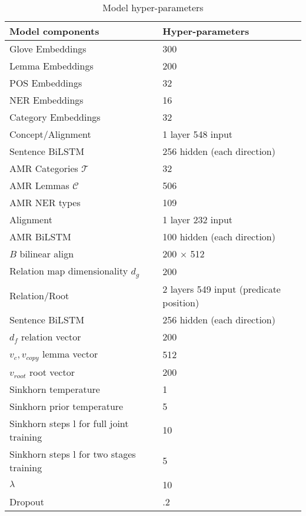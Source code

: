 \documentclass[11pt,a4paper]{article}
\begin{document}
\begin{table}[t!]\small
    \begin{center} 
        \begin{tabular}{ll} 
            \hline  Model components &  Hyper-parameters \\  \hline
          Glove Embeddings & 300\\
            Lemma Embeddings & 200\\
            POS Embeddings & 32\\
            NER Embeddings & 16\\
            Category Embeddings & 32\\ \hline 
           Concept/Alignment & 1 layer 548 input \\
          Sentence BiLSTM & 256 hidden (each direction)\\ \hline 
            AMR Categories $\mathcal{T}$& 32\\
            AMR Lemmas $\mathcal{C}$  & 506\\
           AMR NER types & 109\\ \hline 
           Alignment   & 1 layer 232 input \\
           AMR BiLSTM  & 100 hidden (each direction)\\ \hline 
            $B$ bilinear align  & 200 $\times$ 512\\ \hline 
            Relation map dimensionality $d_g$  & 200 \\ \hline 
           Relation/Root &2  layers 549 input \tiny(predicate position)  \\
            Sentence BiLSTM&  256 hidden (each direction)\\ \hline 
            $d_f$ relation vector& 200\\
           $v_{c},v_{copy}$ lemma vector & 512\\
           $v_{root}$ root vector & 200\\
           \hline
           Sinkhorn temperature & 1 \\
           Sinkhorn prior temperature & 5 \\
Sinkhorn steps l for full joint training & 10 \\
Sinkhorn steps l for two stages training & 5 \\
         $\lambda$  & 10 \\
 Dropout & .2 \\
            \hline
        \end{tabular}
    \end{center}
	\caption{\label{table:parameter} Model hyper-parameters}
\end{table}
\end{document}
